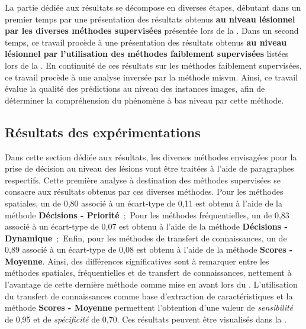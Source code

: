 La partie dédiée aux résultats se décompose en diverses étapes, débutant dans un premier temps par une présentation des résultats obtenus \textbf{au niveau lésionnel par les diverses méthodes supervisées} présentée lors de la . Dans un second temps, ce travail procède à une présentation des résultats obtenus \textbf{au niveau lésionnel par l'utilisation des méthodes faiblement supervisées} listées lors de la . En continuité de ces résultats sur les méthodes faiblement supervisées, ce travail procède à une analyse inversée par la méthode \gls{misvm}. Ainsi, ce travail évalue la qualité des prédictions au niveau des instances images, afin de déterminer la compréhension du phénomène à bas niveau par cette méthode.\par
\clearpage

\subsection{Résultats des expérimentations}
Dans cette section dédiée aux résultats, les diverses méthodes envisagées pour la prise de décision au niveau des lésions vont être traitées à l'aide de paragraphes respectifs. Cette première analyse à destination des méthodes supervisées se consacre aux résultats obtenus par ces diverses méthodes. Pour les méthodes spatiales, un \fscore{} de 0,80 associé à un écart-type de 0,11 est obtenu à l'aide de la méthode \textbf{Décisions - Priorité}~;~Pour les méthodes fréquentielles, un \fscore{} de 0,83 associé à un écart-type de 0,07 est obtenu à l'aide de la méthode \textbf{Décisions - Dynamique}~;~Enfin, pour les méthodes de transfert de connaissances, un \fscore{} de 0,89 associé à un écart-type de 0,08 est obtenu à l'aide de la méthode \textbf{Scores - Moyenne}. Ainsi, des différences significatives sont à remarquer entre les méthodes spatiales, fréquentielles et de transfert de connaissances, nettement à l'avantage de cette dernière méthode comme mise en avant lors du . L'utilisation du transfert de connaissances comme base d'extraction de caractéristiques et la méthode \textbf{Scores - Moyenne} permettent l'obtention d'une valeur de \textit{sensibilité} de 0,95 et de \textit{spécificité} de 0,70. Ces résultats peuvent être visualisés dans la .\par

